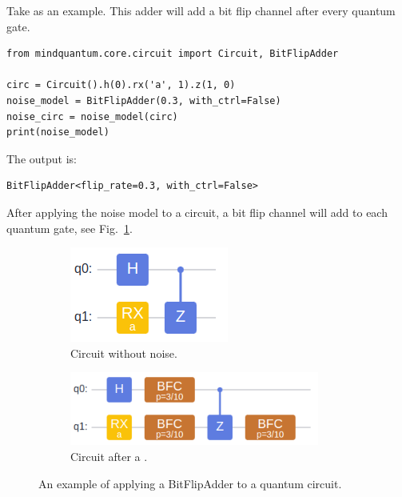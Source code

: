 Take \BitFlipAdder as an example. This adder will add a bit flip channel after every quantum gate.
\begin{lstlisting}
from mindquantum.core.circuit import Circuit, BitFlipAdder

circ = Circuit().h(0).rx('a', 1).z(1, 0)
noise_model = BitFlipAdder(0.3, with_ctrl=False)
noise_circ = noise_model(circ)
print(noise_model)
\end{lstlisting}
The output is:
\begin{lstlisting}
BitFlipAdder<flip_rate=0.3, with_ctrl=False>
\end{lstlisting}
After applying the noise model to a circuit, a bit flip channel will add to each quantum gate, see Fig.~\ref{fig:bit_flip_adder}.
\begin{figure}
    \centering
    \begin{subfigure}{0.2\textwidth}
        \centering
        \includegraphics[width=\textwidth]{images/4_3_no_bit_fip.png}
        \caption{Circuit without noise.}
    \end{subfigure}
    \begin{subfigure}{0.4\textwidth}
        \centering
        \includegraphics[width=0.9\textwidth]{images/4_3_bit_fip.png}
        \caption{Circuit after a .}
    \end{subfigure}
    \caption{An example of applying a BitFlipAdder to a quantum circuit.}
    \label{fig:bit_flip_adder}
\end{figure}

